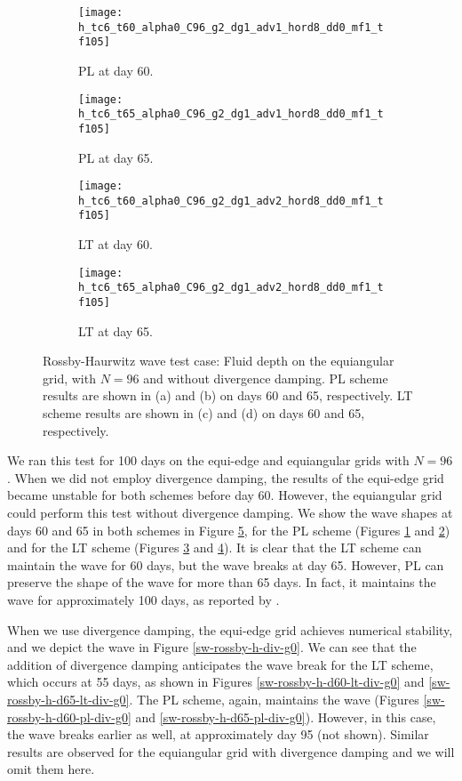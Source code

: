 \begin{figure}[!h]
	\centering
	\begin{subfigure}{0.49\textwidth}
		\centering
		\texttt{[image: h\_tc6\_t60\_alpha0\_C96\_g2\_dg1\_adv1\_hord8\_dd0\_mf1\_tf105]}
		\caption{PL at day 60.\label{sw-rossby-h-d60-pl}}
	\end{subfigure}
	\begin{subfigure}{0.49\textwidth}
		\centering
		\texttt{[image: h\_tc6\_t65\_alpha0\_C96\_g2\_dg1\_adv1\_hord8\_dd0\_mf1\_tf105]}
		\caption{PL at day 65.\label{sw-rossby-h-d65-pl}}
	\end{subfigure}
	
	\begin{subfigure}{0.49\textwidth}
		\centering
		\texttt{[image: h\_tc6\_t60\_alpha0\_C96\_g2\_dg1\_adv2\_hord8\_dd0\_mf1\_tf105]}
		\caption{LT at day 60.\label{sw-rossby-h-d60-lt}}
	\end{subfigure}
	\begin{subfigure}{0.49\textwidth}
		\centering
		\texttt{[image: h\_tc6\_t65\_alpha0\_C96\_g2\_dg1\_adv2\_hord8\_dd0\_mf1\_tf105]}
		\caption{LT at day 65.\label{sw-rossby-h-d65-lt}}
	\end{subfigure}
	\caption{Rossby-Haurwitz wave test case:
		Fluid depth on the equiangular grid, with $N=96$ and without divergence damping.
		PL scheme results are shown in (a) and (b) on days 60 and 65, respectively.
		LT scheme results are shown in (c) and (d) on days 60 and 65, respectively.
		\label{sw-rossby-h}}
\end{figure}
We ran this test for 100 days on the equi-edge and equiangular grids with $N=96$.
When we did not employ divergence damping, the results of the equi-edge grid became unstable for both schemes before day 60.
However, the equiangular grid could perform this test without divergence damping.
We show the wave shapes at days 60 and 65 in both schemes in Figure \ref{sw-rossby-h}, 
for the PL scheme (Figures \ref{sw-rossby-h-d60-pl} and \ref{sw-rossby-h-d65-pl}) and 
for the LT scheme (Figures \ref{sw-rossby-h-d60-lt} and \ref{sw-rossby-h-d65-lt}).
It is clear that the LT scheme can maintain the wave for 60 days, but the wave breaks at day 65. 
However, PL can preserve the shape of the wave for more than 65 days. 
In fact, it maintains the wave for approximately 100 days, as reported by \citet{mouallem:2023}.

When we use divergence damping, the equi-edge grid achieves numerical stability,
and we depict the wave in Figure \ref{sw-rossby-h-div-g0}.
We can see that the addition of divergence damping anticipates the wave break for the LT scheme,
which occurs at 55 days, as shown in Figures \ref{sw-rossby-h-d60-lt-div-g0} and \ref{sw-rossby-h-d65-lt-div-g0}. 
The PL scheme, again, maintains the wave (Figures \ref{sw-rossby-h-d60-pl-div-g0} and \ref{sw-rossby-h-d65-pl-div-g0}).
However, in this case, the wave breaks earlier as well, at approximately day 95 (not shown).
Similar results are observed for the equiangular grid with divergence damping and we will omit them here.

